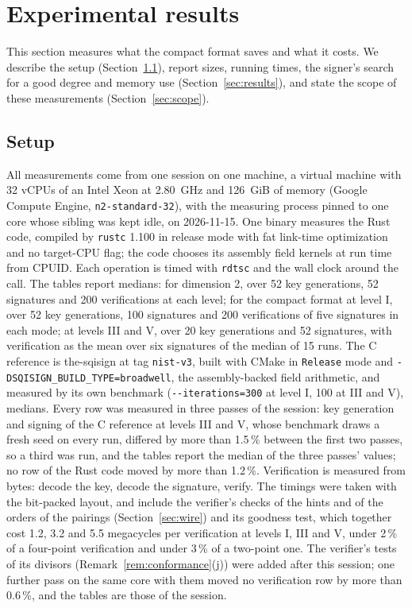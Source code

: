 \documentclass[version=preprint]{iacrcc}
\begin{document}
    \section{Experimental results}
    \label{sec:bench}

    This section measures what the compact format saves and what it costs. We
    describe the setup (Section~\ref{sec:setup}), report sizes, running times,
    the signer's search for a good degree and memory use
    (Section~\ref{sec:results}), and state the scope of these measurements
    (Section~\ref{sec:scope}).

    \subsection{Setup}
    \label{sec:setup}
    All measurements come from one session on one machine, a virtual machine
    with 32 vCPUs of an Intel Xeon at 2.80~GHz and 126~GiB of memory (Google
    Compute Engine, \texttt{n2-standard-32}), with the measuring process
    pinned to one core whose sibling was kept idle, on 2026-11-15. One binary measures the Rust code, compiled by \texttt{rustc}
    1.100 in release mode with fat link-time optimization and no target-CPU
    flag; the code chooses its assembly field kernels at run time from CPUID.
    Each operation is timed with \texttt{rdtsc} and the wall clock around the
    call. The tables report medians: for dimension 2, over 52 key generations,
    52 signatures and 200 verifications at each level; for the compact format
    at level I, over 52 key generations, 100 signatures and 200 verifications
    of five signatures in each mode; at levels III and V, over 20 key
    generations and 52 signatures, with verification as the mean over six
    signatures of the median of 15 runs. The C reference is the-sqisign at tag
    \texttt{nist-v3}, built with CMake in \texttt{Release} mode and
    \texttt{-DSQISIGN\_BUILD\_TYPE=broadwell}, the assembly-backed field
    arithmetic, and measured by its own benchmark
    (\texttt{-{}-iterations=300} at level I, 100 at III and V), medians. Every row was measured in three passes of the session: key generation and signing of the C reference at levels III and V, whose benchmark draws a fresh seed on every run, differed by more than 1.5\,\% between the first two passes, so a third was run, and the tables report the median of the three passes' values; no row of the Rust code moved by more than 1.2\,\%.
    Verification is measured from bytes: decode the key, decode the signature,
    verify. The timings were taken with the bit-packed layout, and include the
    verifier's checks of the hints and of the orders of the pairings
    (Section~\ref{sec:wire}) and its goodness test, which together cost
    1.2, 3.2 and 5.5 megacycles per verification at levels I, III and V, under
    2\,\% of a four-point verification and under 3\,\% of a two-point one.
    The verifier's tests of its divisors (Remark~\ref{rem:conformance}(j))
    were added after this session; one further pass on the same core with
    them moved no verification row by more than 0.6\,\%, and the tables are
    those of the session.
\end{document}
